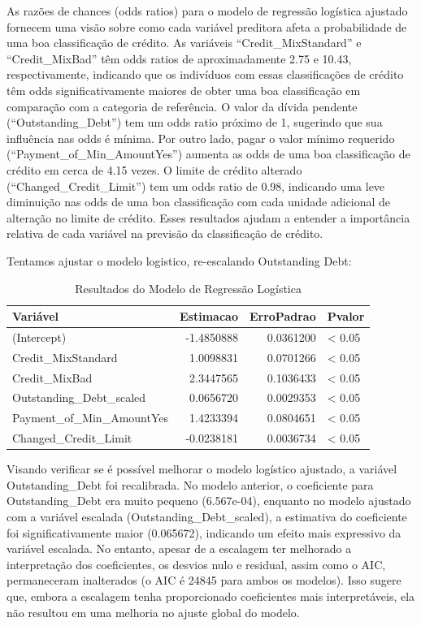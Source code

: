 \documentclass[
  letterpaper,
  DIV=11,
  numbers=noendperiod]{scrreprt}
\begin{document}
As razões de chances (odds ratios) para o modelo de regressão logística
ajustado fornecem uma visão sobre como cada variável preditora afeta a
probabilidade de uma boa classificação de crédito. As variáveis
``Credit\_MixStandard'' e ``Credit\_MixBad'' têm odds ratios de
aproximadamente 2.75 e 10.43, respectivamente, indicando que os
indivíduos com essas classificações de crédito têm odds
significativamente maiores de obter uma boa classificação em comparação
com a categoria de referência. O valor da dívida pendente
(``Outstanding\_Debt'') tem um odds ratio próximo de 1, sugerindo que
sua influência nas odds é mínima. Por outro lado, pagar o valor mínimo
requerido (``Payment\_of\_Min\_AmountYes'') aumenta as odds de uma boa
classificação de crédito em cerca de 4.15 vezes. O limite de crédito
alterado (``Changed\_Credit\_Limit'') tem um odds ratio de 0.98,
indicando uma leve diminuição nas odds de uma boa classificação com cada
unidade adicional de alteração no limite de crédito. Esses resultados
ajudam a entender a importância relativa de cada variável na previsão da
classificação de crédito.

Tentamos ajustar o modelo logistico, re-escalando Outstanding Debt:

\begin{longtable}[t]{lrrl}
\caption{\label{tab:unnamed-chunk-35}Resultados do Modelo de Regressão Logística}\\
\toprule
Variável & Estimacao & ErroPadrao & Pvalor\\
\midrule
(Intercept) & -1.4850888 & 0.0361200 & < 0.05\\
Credit\_MixStandard & 1.0098831 & 0.0701266 & < 0.05\\
Credit\_MixBad & 2.3447565 & 0.1036433 & < 0.05\\
Outstanding\_Debt\_scaled & 0.0656720 & 0.0029353 & < 0.05\\
Payment\_of\_Min\_AmountYes & 1.4233394 & 0.0804651 & < 0.05\\
\addlinespace
Changed\_Credit\_Limit & -0.0238181 & 0.0036734 & < 0.05\\
\bottomrule
\end{longtable}

Visando verificar se é possível melhorar o modelo logístico ajustado, a
variável Outstanding\_Debt foi recalibrada. No modelo anterior, o
coeficiente para Outstanding\_Debt era muito pequeno (6.567e-04),
enquanto no modelo ajustado com a variável escalada
(Outstanding\_Debt\_scaled), a estimativa do coeficiente foi
significativamente maior (0.065672), indicando um efeito mais expressivo
da variável escalada. No entanto, apesar de a escalagem ter melhorado a
interpretação dos coeficientes, os desvios nulo e residual, assim como o
AIC, permaneceram inalterados (o AIC é 24845 para ambos os modelos).
Isso sugere que, embora a escalagem tenha proporcionado coeficientes
mais interpretáveis, ela não resultou em uma melhoria no ajuste global
do modelo.
\end{document}
